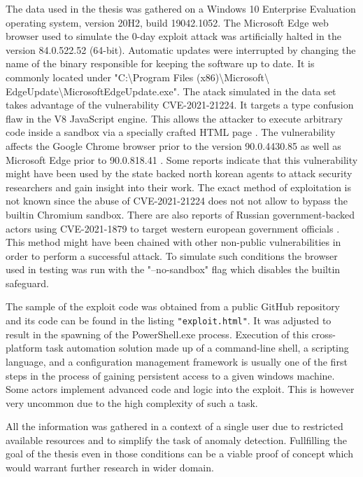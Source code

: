 \documentclass[a4paper,twoside,12pt]{book}
\begin{document}
The data used in the thesis was gathered on a Windows 10 Enterprise Evaluation operating 
system, version 20H2, build 19042.1052. The Microsoft Edge web browser used to simulate 
the 0-day exploit attack was artificially halted in the version 84.0.522.52 (64-bit). 
Automatic updates were interrupted by changing the name of the binary responsible for 
keeping the software up to date. It is commonly located under 
"C:\textbackslash Program Files (x86)\textbackslash Microsoft\textbackslash 
EdgeUpdate\textbackslash MicrosoftEdgeUpdate.exe". 
The atack simulated in the data set takes advantage of the vulnerability CVE-2021-21224. It 
targets a type confusion flaw in the V8 JavaScript engine. This allows the attacker to 
execute arbitrary code inside a sandbox via a specially crafted HTML page \cite{bib:CVE21224}. 
The vulnerability affects the Google Chrome browser prior to the version 90.0.4430.85 as 
well as Microsoft Edge prior to 90.0.818.41 \cite{bib:edgeRelease}. Some reports indicate 
that this vulnerability might have been used by the state backed north korean agents to 
attack security researchers and gain insight into their work. The exact method of
exploitation is not known since the abuse of CVE-2021-21224 does not not allow to bypass 
the builtin Chromium sandbox. There are also reports of Russian government-backed actors 
using CVE-2021-1879 to target western european government officials \cite{bib:googleBlog}. 
This method might have been chained with other non-public vulnerabilities in order to 
perform a successful attack. To simulate such conditions the browser used in testing was 
run with the "--no-sandbox" flag which disables the builtin safeguard.

The sample of the exploit code was obtained from a public GitHub repository 
\cite{bib:sampleExploit} and its code can be found in the listing \lstinline|"exploit.html"|. 
It was adjusted to result in the spawning of the PowerShell.exe process. Execution of this 
cross-platform task automation solution made up of a command-line shell, a scripting 
language, and a configuration management framework is usually one of the first steps in 
the process of gaining persistent access to a given windows machine. Some actors implement advanced 
code and logic into the exploit. This is however very uncommon due to the high complexity 
of such a task.

All the information was gathered in a context of a single user due to restricted available
resources and to simplify the task of anomaly detection. Fullfilling the goal of the thesis
even in those conditions can be a viable proof of concept which would warrant further 
research in wider domain.  
\end{document}
